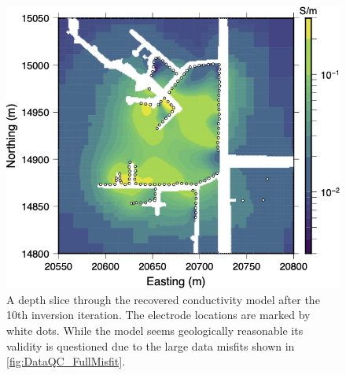 \documentclass[final,authoryear,5p,times,twocolumn]{elsarticle}
\begin{document}
\begin{figure} [!ht]
    \begin{center}
    \includegraphics[trim=0cm 0cm 0cm 0cm, clip=true,width=0.95\linewidth]{./Figures/Fig3.png}
    \end{center}
\caption{A depth slice through the recovered conductivity model after the 10th inversion iteration. The electrode locations are marked by white dots. While the model seems geologically reasonable its validity is questioned due to the large data misfits shown in \ref{fig:DataQC_FullMisfit}.}
\label{fig:DataQC_FullInvResult}
\end{figure}
\end{document}
